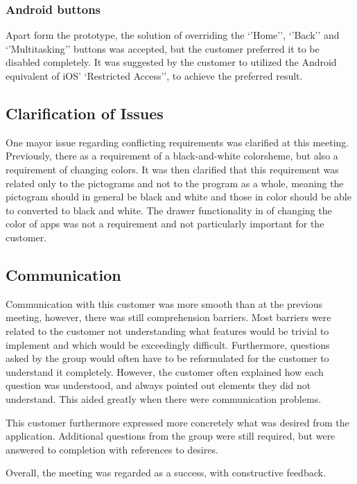 \subsubsection{Android buttons}
Apart form the prototype, the solution of overriding the `'Home'', `'Back'' and `'Multitasking'' buttons was accepted, but the customer preferred it to be disabled completely.
It was suggested by the customer to utilized the Android equivalent of iOS' `Restricted Access'', to achieve the preferred result.

\subsection{Clarification of Issues}
One mayor issue regarding conflicting requirements was clarified at this meeting.
Previously, there as a requirement of a black-and-white colorsheme, but also a requirement of changing colors.
It was then clarified that this requirement was related only to the pictograms and not to the program as a whole, meaning the pictogram should in general be black and white and those in color should be able to converted to black and white.
The drawer functionality in \launcher of changing the color of apps was not a requirement and not particularly important for the customer.

\subsection{Communication}
Communication with this customer was more smooth than at the previous meeting, however, there was still comprehension barriers.
Most barriers were related to the customer not understanding what features would be trivial to implement and which would be exceedingly difficult.
Furthermore, questions asked by the group would often have to be reformulated for the customer to understand it completely.
However, the customer often explained how each question was understood, and always pointed out elements they did not understand.
This aided greatly when there were communication problems.

This customer furthermore expressed more concretely what was desired from the application.
Additional questions from the group were still required, but were answered to completion with references to desires.

Overall, the meeting was regarded as a success, with constructive feedback.
